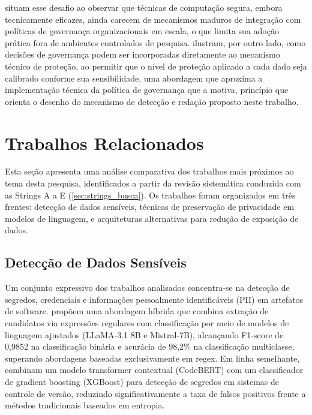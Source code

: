  situam esse desafio ao observar que técnicas de computação segura, embora tecnicamente eficazes, ainda carecem de mecanismos maduros de integração com políticas de governança organizacionais em escala, o que limita sua adoção prática fora de ambientes controlados de pesquisa.  ilustram, por outro lado, como decisões de governança podem ser incorporadas diretamente ao mecanismo técnico de proteção, ao permitir que o nível de proteção aplicado a cada dado seja calibrado conforme sua sensibilidade, uma abordagem que aproxima a implementação técnica da política de governança que a motiva, princípio que orienta o desenho do mecanismo de detecção e redação proposto neste trabalho.
    
\section{Trabalhos Relacionados}
\label{sec:trabalhos_relacionados}

Esta seção apresenta uma análise comparativa dos trabalhos mais próximos ao tema desta pesquisa, identificados a partir da revisão sistemática conduzida com as Strings A a E (\ref{sec:strings_busca}). Os trabalhos foram organizados em três frentes: detecção de dados sensíveis, técnicas de preservação de privacidade em modelos de linguagem, e arquiteturas alternativas para redução de exposição de dados.

\subsection{Detecção de Dados Sensíveis}

Um conjunto expressivo dos trabalhos analisados concentra-se na detecção de segredos, credenciais e informações pessoalmente identificáveis (PII) em artefatos de software.  propõem uma abordagem híbrida que combina extração de candidatos via expressões regulares com classificação por meio de modelos de linguagem ajustados (LLaMA-3.1 8B e Mistral-7B), alcançando F1-score de 0,9852 na classificação binária e acurácia de 98,2\% na classificação multiclasse, superando abordagens baseadas exclusivamente em regex. Em linha semelhante,  combinam um modelo transformer contextual (CodeBERT) com um classificador de gradient boosting (XGBoost) para detecção de segredos em sistemas de controle de versão, reduzindo significativamente a taxa de falsos positivos frente a métodos tradicionais baseados em entropia.

